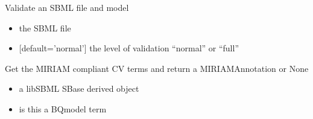 \documentclass[letterpaper,10pt,english]{sphinxmanual}
\begin{document}

\begin{fulllineitems}
\label{\detokenize{modules_doc:cbmpy.CBXML.sbml_fileValidate}}
\pysigstartsignatures
{}
\pysigstopsignatures
\sphinxAtStartPar
Validate an SBML file and model
\begin{itemize}
\item {} 
\sphinxAtStartPar
{} the SBML file

\item {} 
\sphinxAtStartPar
{} {[}default=’normal’{]} the level of validation “normal” or “full”

\end{itemize}

\end{fulllineitems}


\begin{fulllineitems}
\label{\detokenize{modules_doc:cbmpy.CBXML.sbml_getCVterms}}
\pysigstartsignatures
{}
\pysigstopsignatures
\sphinxAtStartPar
Get the MIRIAM compliant CV terms and return a MIRIAMAnnotation or None
\begin{itemize}
\item {} 
\sphinxAtStartPar
{} a libSBML SBase derived object

\item {} 
\sphinxAtStartPar
{} is this a BQmodel term

\end{itemize}

\end{fulllineitems}

\end{document}
